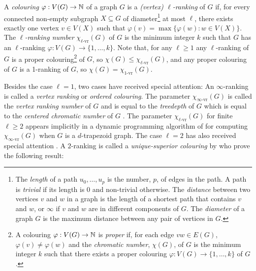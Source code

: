 \documentclass[kpfonts]{patmorin}
\newcommand{\rn}[1]{\chi_{\operatorname{#1-vr}}}
\newcommand{\irn}{\rn{\infty}}
\newcommand{\lrn}{\rn{\ell}}
\theoremstyle{named}
\begin{document}
A \emph{colouring} $\varphi:V(G)\to \mathbb{N}$ of a graph $G$ is a \emph{(vertex) $\ell$-ranking} of $G$ if, for every connected non-empty subgraph $X\subseteq G$ of diameter\footnote{The \emph{length} of a path $u_0,\ldots,u_p$ is the number, $p$, of edges in the path. A path is \emph{trivial} if its length is 0 and non-trivial otherwise. The \emph{distance} between two vertices $v$ and $w$ in a graph is the length of a shortest path that contains $v$ and $w$, or $\infty$ if $v$ and $w$ are in different components of $G$. The \emph{diameter} of a graph $G$ is the maximum distance between any pair of vertices in $G$.}  at most $\ell$, there exists exactly one vertex $v\in V(X)$ such that $\varphi(v)=\max\{\varphi(w):w\in V(X)\}$.  The \emph{$\ell$-ranking number} $\lrn(G)$ of $G$ is the minimum integer $k$ such that $G$ has an $\ell$-ranking $\varphi:V(G)\to \{1,\ldots,k\}$.  Note that, for any $\ell\ge 1$ any $\ell$-ranking of $G$ is a proper colouring\footnote{A colouring $\varphi:V(G)\to \mathbb{N}$ is \emph{proper} if, for each edge $vw\in E(G)$, $\varphi(v)\neq\varphi(w)$ and the \emph{chromatic number}, $\chi(G)$, of $G$ is the minimum integer $k$ such that there exists a proper colouring $\varphi:V(G)\to\{1,\ldots,k\}$ of $G$.} of $G$, so $\chi(G)\le \lrn(G)$, and any proper colouring of $G$ is a 1-ranking of $G$, so $\chi(G)=\rn{1}(G)$.

Besides the case $\ell=1$, two cases have received special attention: An $\infty$-ranking is called a \emph{vertex ranking} or \emph{ordered colouring}. The parameter $\irn(G)$ is called the \emph{vertex ranking number} of $G$ and is equal to the \emph{treedepth} of $G$ which is equal to the \emph{centered chromatic number} of $G$ \cite{nesetril.ossona:tree-depth}.
The parameter $\lrn(G)$ for finite $\ell\ge 2$ appears implicitly in a dynamic programming algorithm of \citet{deogun.kloks.ea:on} for computing $\irn(G)$ when $G$ is a $d$-trapezoid graph.  The case $\ell=2$ has also received special attention \cite{almeter.demircan.ea:graph,karpas.neiman.ea:on,shalu.antony:complexity}. A $2$-ranking is called a \emph{unique-superior colouring} by \citet{karpas.neiman.ea:on} who prove the following result:
\end{document}

